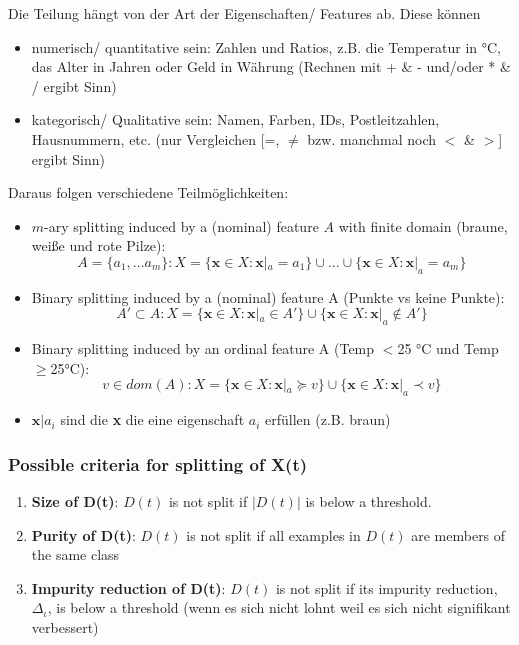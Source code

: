 \documentclass[11pt,a4paper]{article}
\begin{document}
\begin{flushleft}
Die Teilung hängt von der Art der Eigenschaften/ Features ab. Diese können
\begin{itemize}
\item numerisch/ quantitative sein: Zahlen und Ratios, z.B. die Temperatur in °C, das Alter in Jahren oder Geld in Währung (Rechnen mit + \& - und/oder * \& / ergibt Sinn)
\item kategorisch/ Qualitative sein: Namen, Farben, IDs, Postleitzahlen, Hausnummern, etc. (nur Vergleichen [=, $\neq$ bzw. manchmal noch $<$ \& $>$] ergibt Sinn)
\end{itemize}

Daraus folgen verschiedene Teilmöglichkeiten:
\begin{itemize}
\item $m$-ary splitting induced by a (nominal) feature $A$ with finite domain (braune, weiße und rote Pilze):
$$A = \{a_1,...a_m\}: X = \{\textbf{x} \in X: \textbf{x}|_a = a_1 \} \cup ... \cup \{\textbf{x} \in X: \textbf{x}|_a = a_m \} $$
\item Binary splitting induced by a (nominal) feature A (Punkte vs keine Punkte):
$$ A' \subset A : X = \{\textbf{x} \in X: \textbf{x}|_a \in A' \} \cup \{\textbf{x} \in X: \textbf{x}|_a  \notin A' \} $$
\item Binary splitting induced by an ordinal feature A (Temp $<$25 °C und Temp $\geq $25°C): 
$$ v \in dom (A): X = \{\textbf{x} \in X: \textbf{x} |_a  \succeq v \} \cup \{\textbf{x} \in X: \textbf{x}|_a \prec  v \} $$
\item $\textbf{x}|a_i$ sind die \textbf{x} die eine eigenschaft $a_i$ erfüllen (z.B. braun)
\end{itemize}

\subsubsection{Possible criteria for splitting of X(t)}
\begin{enumerate}
\item \textbf{Size of D(t)}: $D(t)$ is not split if $|D(t)|$ is below a threshold.
\item \textbf{Purity of D(t)}: $D(t)$ is not split if all examples in $D(t)$ are members of the same class
\item \textbf{Impurity reduction of D(t)}: $D(t)$ is not split if its impurity reduction, $\Delta_\iota $, is below a threshold (wenn es sich nicht lohnt weil es sich nicht signifikant verbessert)
\end{enumerate}


\end{flushleft}
\end{document}
